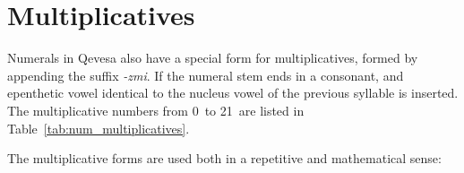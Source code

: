 \documentclass[grammar]{subfiles}
\begin{document}
  \section{Multiplicatives}
  \label{sec:num_multiplicatives}

  Numerals in Qevesa also have a special form for multiplicatives, formed by appending the suffix \textit{-zmi}. If the numeral stem ends in a consonant, and epenthetic vowel identical to the nucleus vowel of the previous syllable is inserted. The multiplicative numbers from 0\dec\ to 21\dec\ are listed in Table~\ref{tab:num_multiplicatives}.

  \begin{table}[htpb]\small\capstart
    \begin{center}
      \qquad
      \caption{Multiplicative numerals from 0\dec\ to 21\dec\label{tab:num_multiplicatives}}
    \end{center}
  \end{table}

  The multiplicative forms are used both in a repetitive and mathematical sense:
\end{document}
